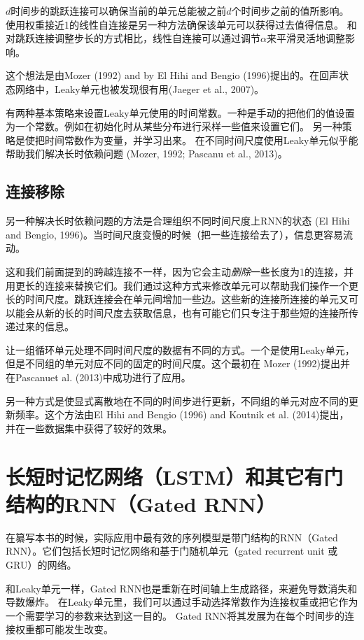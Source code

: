 $d$时间步的跳跃连接可以确保当前的单元总能被之前$d$个时间步之前的值所影响。
使用权重接近1的线性自连接是另一种方法确保该单元可以获得过去值得信息。
和对跳跃连接调整步长的方式相比，线性自连接可以通过调节$\alpha$来平滑灵活地调整影响。

这个想法是由Mozer (1992) and by El Hihi and Bengio (1996)提出的。在回声状态网络中，Leaky单元也被发现很有用(Jaeger et al., 2007)。

有两种基本策略来设置Leaky单元使用的时间常数。一种是手动的把他们的值设置为一个常数。例如在初始化时从某些分布进行采样一些值来设置它们。
另一种策略是使把时间常数作为变量，并学习出来。
在不同时间尺度使用Leaky单元似乎能帮助我们解决长时依赖问题 (Mozer, 1992; Pascanu et al., 2013)。


\subsection{连接移除}
\label{sec:10.9.3}
另一种解决长时依赖问题的方法是合理组织不同时间尺度上RNN的状态 (El Hihi and Bengio, 1996)。当时间尺度变慢的时候（把一些连接给去了），信息更容易流动。

这和我们前面提到的跨越连接不一样，因为它会主动\emph{删除}一些长度为1的连接，并用更长的连接来替换它们。我们通过这种方式来修改单元可以帮助我们操作一个更长的时间尺度。跳跃连接会在单元间增加一些边。这些新的连接所连接的单元又可以能会从新的长的时间尺度去获取信息，也有可能它们只专注于那些短的连接所传递过来的信息。

让一组循环单元处理不同时间尺度的数据有不同的方式。一个是使用Leaky单元，但是不同组的单元对应不同的固定的时间尺度。这个最初在 Mozer (1992)提出并在Pascanuet al. (2013)中成功进行了应用。

另一种方式是使显式离散地在不同的时间步进行更新，不同组的单元对应不同的更新频率。这个方法由El Hihi and Bengio (1996) and Koutnik et al. (2014)提出，并在一些数据集中获得了较好的效果。

\section{长短时记忆网络（LSTM）和其它有门结构的RNN（Gated RNN）}
\label{sec:10.10}
在纂写本书的时候，实际应用中最有效的序列模型是带门结构的RNN（Gated RNN）。它们包括长短时记忆网络和基于门随机单元（gated recurrent unit 或 GRU）的网络。

和Leaky单元一样，Gated RNN也是重新在时间轴上生成路径，来避免导数消失和导数爆炸。
在Leaky单元里，我们可以通过手动选择常数作为连接权重或把它作为一个需要学习的参数来达到这一目的。
Gated RNN将其发展为在每个时间步的连接权重都可能发生改变。

